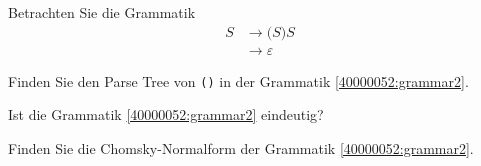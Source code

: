 Betrachten Sie die Grammatik
\begin{equation}
\begin{aligned}
S&\rightarrow \texttt{(} S \texttt{)} S
\\
&\rightarrow \varepsilon
\end{aligned}
\label{40000052:grammar2}
\end{equation}
\begin{teilaufgaben}
\item Finden Sie den Parse Tree von \texttt{()} in der Grammatik
\eqref{40000052:grammar2}.
\item Ist die Grammatik \eqref{40000052:grammar2} eindeutig?
\item Finden Sie die Chomsky-Normalform der Grammatik \eqref{40000052:grammar2}.
\end{teilaufgaben}



